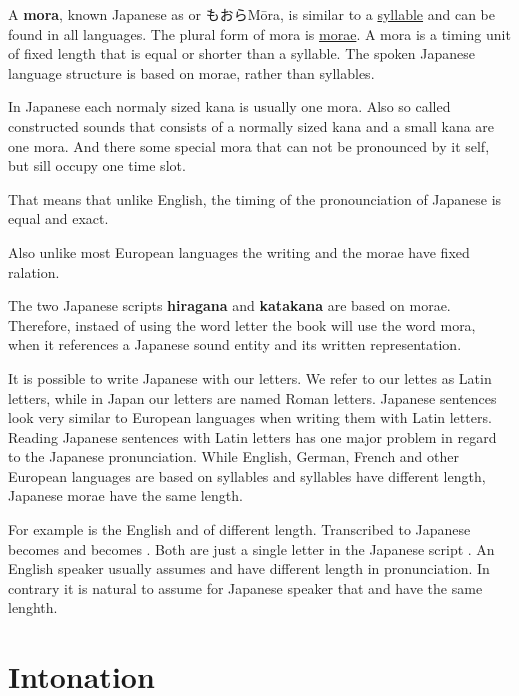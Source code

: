 
A \textbf{mora}, known Japanese as  or
もおら{Mōra}, is similar to a
\hyperref[sec:Syllable]{syllable} and can be found in all languages. The plural
form of mora is \hyperref[sec:Mora]{morae}. A mora is a timing unit of fixed
length that is equal or shorter than a syllable. The spoken Japanese language
structure is based on morae, rather than syllables.

In Japanese each normaly sized kana is usually one mora. Also so called
constructed sounds that consists of a normally sized kana and a small kana
are one mora. And there some special mora that can not be pronounced by
it self, but sill occupy one time slot.

 That means that unlike English, the timing of the
pronounciation of Japanese is equal and exact.

Also unlike most European languages the writing
and the morae have fixed ralation.

The two
Japanese scripts \textbf{hiragana} and \textbf{katakana} are based on morae.
Therefore, instaed of using the word letter the book will use the word mora,
when it references a Japanese sound entity and its written representation.

It is possible to write Japanese with our letters. We refer to our lettes as
Latin letters, while in Japan our letters are named Roman letters. Japanese
sentences look very similar to European languages when writing them with Latin
letters. Reading Japanese sentences with Latin letters has one major problem
in regard to the Japanese pronunciation. While English, German, French and
other European languages are based on syllables and syllables have different
length, Japanese morae have the same length.

For example is the English  and  of different length.
Transcribed to Japanese  becomes \jquotesingleja{\jkanaletteri} and
 becomes \jquotesingleja{\jkanalettershi}. Both are just a single
letter in the Japanese script \jtopic. An English speaker usually assumes
 and  have different length in pronunciation. In contrary it is
natural to assume for Japanese speaker that \jquotesingleja{\jkanaletteri} and
\jquotesingleja{\jkanalettershi} have the same lenghth.

\section{Intonation}

